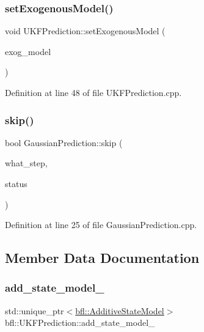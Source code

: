 \subsubsection{\texorpdfstring{set\+Exogenous\+Model()}{setExogenousModel()}}
{\footnotesize\ttfamily void U\+K\+F\+Prediction\+::set\+Exogenous\+Model (\begin{DoxyParamCaption}\item[{std\+::unique\+\_\+ptr$<$ \mbox{\hyperlink{classbfl_1_1ExogenousModel}{bfl\+::\+Exogenous\+Model}} $>$}]{exog\+\_\+model }\end{DoxyParamCaption})}



Definition at line 48 of file U\+K\+F\+Prediction.\+cpp.

\mbox{\label{classbfl_1_1GaussianPrediction_ae647821cf920ea81f981ebc9260cdbe6}} 
\subsubsection{\texorpdfstring{skip()}{skip()}}
{\footnotesize\ttfamily bool Gaussian\+Prediction\+::skip (\begin{DoxyParamCaption}\item[{const std\+::string \&}]{what\+\_\+step,  }\item[{const bool}]{status }\end{DoxyParamCaption})\hspace{0.3cm}{\ttfamily [inherited]}}



Definition at line 25 of file Gaussian\+Prediction.\+cpp.



\subsection{Member Data Documentation}
\mbox{\label{classbfl_1_1UKFPrediction_a5a46ad7497980d4ae42f8e25de991b95}} 
\subsubsection{\texorpdfstring{add\+\_\+state\+\_\+model\+\_\+}{add\_state\_model\_}}
{\footnotesize\ttfamily std\+::unique\+\_\+ptr$<$\mbox{\hyperlink{classbfl_1_1AdditiveStateModel}{bfl\+::\+Additive\+State\+Model}}$>$ bfl\+::\+U\+K\+F\+Prediction\+::add\+\_\+state\+\_\+model\+\_\+\hspace{0.3cm}{\ttfamily [protected]}}



